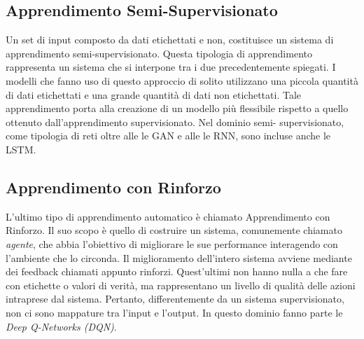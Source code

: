 \subsection{Apprendimento Semi-Supervisionato}
Un set di input composto da dati etichettati e non, costituisce un sistema 
di apprendimento semi-supervisionato. Questa tipologia di apprendimento 
rappresenta un sistema che si interpone tra i due precedentemente spiegati. 
I modelli che fanno uso di questo approccio di solito utilizzano una piccola 
quantità di dati etichettati e una grande quantità di dati non etichettati. 
Tale apprendimento porta alla creazione di un modello più flessibile rispetto 
a quello ottenuto dall'apprendimento supervisionato. Nel dominio semi-
supervisionato, come tipologia di reti oltre alle le GAN e alle le RNN, 
sono incluse anche le LSTM.

\subsection{Apprendimento con Rinforzo}
L'ultimo tipo di apprendimento automatico è chiamato Apprendimento con 
Rinforzo. Il suo scopo è quello di costruire un sistema, comunemente chiamato 
\emph{agente}, che abbia l'obiettivo di migliorare le sue performance interagendo 
con l'ambiente che lo circonda. Il miglioramento dell'intero sistema avviene 
mediante dei feedback chiamati appunto rinforzi. Quest'ultimi non hanno 
nulla a che fare con etichette o valori di verità, ma rappresentano un livello 
di qualità delle azioni intraprese dal sistema. Pertanto, differentemente da 
un sistema supervisionato, non ci sono mappature tra l'input e l'output. In 
questo dominio fanno parte le \emph{Deep Q-Networks (DQN)}.


